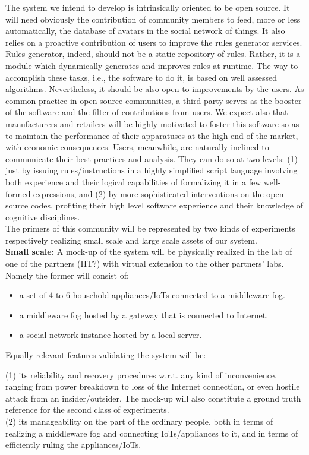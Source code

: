 The system we intend to develop is intrinsically oriented to be open source. It will need obviously the contribution of community members to feed, more or less automatically, the database of avatars in the social network of things. It also relies on a proactive contribution of users to improve the rules generator services. Rules generator, indeed, should not be a static repository of rules. Rather, it is a module which dynamically generates and improves rules at runtime. The way to accomplish these tasks, i.e., the software to do it, is based on well assessed algorithms. Nevertheless, it should be also open to improvements by the users. As common practice in open source communities, a third party serves as the booster of the software and the filter of contributions from users. We expect also that manufacturers and retailers will be highly motivated to foster this software so as to maintain the performance of their apparatuses at the high end of the market, with economic consequences. Users, meanwhile, are naturally inclined to communicate their best practices and analysis. They can do so at two levels: (1) just by issuing rules/instructions in a highly simplified script language involving both experience and their logical capabilities of formalizing it in a few well-formed expressions, and (2) by more sophisticated interventions on the open source codes, profiting their high level software experience and their knowledge of cognitive disciplines.\\
The primers of this community will be represented by two kinds of experiments respectively realizing small scale and large scale assets of our system.\\

\textbf{Small scale:}
A mock-up of the system will be physically realized in the lab of one of the partners (IIT?) with virtual extension to the other partners’ labs. Namely the former will consist of:

\begin{itemize}
	\item a set of 4 to 6 household appliances/IoTs connected to a middleware fog.
	\item a middleware fog hosted by a gateway that is connected to Internet.
	\item a social network instance hosted by a local server.
\end{itemize}

Equally relevant features validating the system will be:

(1) its reliability and recovery procedures w.r.t. any kind of inconvenience, ranging from power breakdown to loss of the Internet connection, or even hostile attack from an insider/outsider. The mock-up will also constitute a ground truth reference for the second class of experiments.\\
(2) its manageability on the part of the ordinary people, both in terms of realizing a middleware fog and connecting IoTs/appliances to it, and in terms of efficiently ruling the appliances/IoTs.\\

